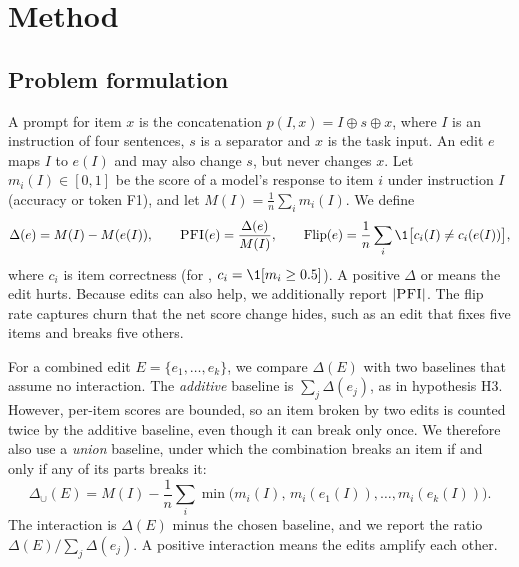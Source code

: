 \section{Method}
\label{sec:method}

\subsection{Problem formulation}
A prompt for item $x$ is the concatenation $p(I, x) = I \oplus s \oplus x$, where $I$ is an instruction of four sentences, $s$ is a separator and $x$ is the task input. An edit $e$ maps $I$ to $e(I)$ and may also change $s$, but never changes $x$. Let $m_i(I) \in [0,1]$ be the score of a model's response to item $i$ under instruction $I$ (accuracy or token F1), and let $M(I) = \frac{1}{n}\sum_i m_i(I)$. We define
\begin{equation}
\Delta(e) = M(I) - M(e(I)), \qquad \pfi(e) = \frac{\Delta(e)}{M(I)}, \qquad \mathrm{Flip}(e) = \frac{1}{n}\sum_{i} \1\big[c_i(I) \neq c_i(e(I))\big],
\end{equation}
where $c_i$ is item correctness (for \squad, $c_i = \1[m_i \geq 0.5]$). A positive $\Delta$ or \pfi means the edit hurts. Because edits can also help, we additionally report $|\textsc{PFI}|$. The flip rate captures churn that the net score change hides, such as an edit that fixes five items and breaks five others.

For a combined edit $E = \{e_1, \dots, e_k\}$, we compare $\Delta(E)$ with two baselines that assume no interaction. The \emph{additive} baseline is $\sum_j \Delta(e_j)$, as in hypothesis H3. However, per-item scores are bounded, so an item broken by two edits is counted twice by the additive baseline, even though it can break only once. We therefore also use a \emph{union} baseline, under which the combination breaks an item if and only if any of its parts breaks it:
\begin{equation}
\Delta_{\cup}(E) = M(I) - \frac{1}{n}\sum_i \min\big(m_i(I),\, m_i(e_1(I)), \dots, m_i(e_k(I))\big).
\end{equation}
The interaction is $\Delta(E)$ minus the chosen baseline, and we report the ratio $\Delta(E)/\sum_j\Delta(e_j)$. A positive interaction means the edits amplify each other.


